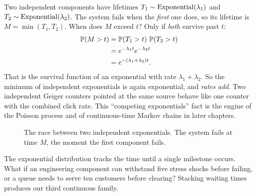 \begin{example}
\label{ch11:ex-min}
Two independent components have lifetimes $T_1 \sim \Expo(\lambda_1)$ and
$T_2 \sim \Expo(\lambda_2)$. The system fails when the \emph{first} one does, so
its lifetime is $M = \min(T_1,T_2)$. When does $M$ exceed $t$? Only if
\emph{both} survive past $t$:
\begin{align*}
  \P(M > t) &= \P(T_1 > t)\,\P(T_2 > t) \\
            &= e^{-\lambda_1 t}e^{-\lambda_2 t} \\
            &= e^{-(\lambda_1+\lambda_2)t}.
\end{align*}
That is the survival function of an exponential with rate
$\lambda_1 + \lambda_2$. So the minimum of independent exponentials is again
exponential, and \emph{rates add}. Two independent Geiger counters pointed at the
same source behave like one counter with the combined click rate. This
``competing exponentials'' fact is the engine of the Poisson process and of
continuous-time Markov chains in later chapters.
\end{example}

\begin{figure}[H]
\centering
{}
\caption{The race between two independent exponentials. The system fails at time $M$, the moment the first component fails.}
\label{ch11:fig-expo-min}
\end{figure}

The exponential distribution tracks the time until a single milestone occurs.
What if an engineering component can withstand five stress shocks before
failing, or a queue needs to serve ten customers before clearing? Stacking
waiting times produces our third continuous family.

